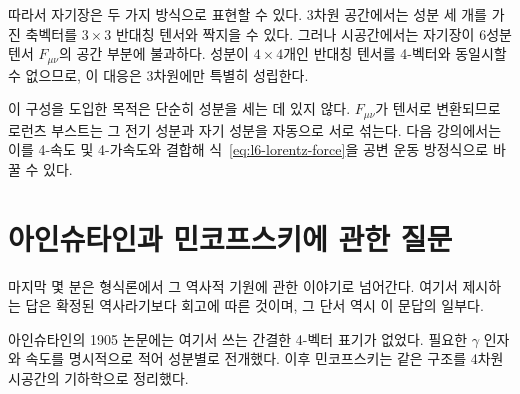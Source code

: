 따라서 자기장은 두 가지 방식으로 표현할 수 있다. 3차원 공간에서는 성분 세 개를 가진 축벡터를 \(3\times3\) 반대칭 텐서와 짝지을 수 있다. 그러나 시공간에서는 자기장이 6성분 텐서 \(F_{\mu\nu}\)의 공간 부분에 불과하다. 성분이 \(4\times4\)개인 반대칭 텐서를 4-벡터와 동일시할 수 없으므로, 이 대응은 3차원에만 특별히 성립한다.

이 구성을 도입한 목적은 단순히 성분을 세는 데 있지 않다. \(F_{\mu\nu}\)가 텐서로 변환되므로 로런츠 부스트는 그 전기 성분과 자기 성분을 자동으로 서로 섞는다. 다음 강의에서는 이를 4-속도 및 4-가속도와 결합해 식~\eqref{eq:l6-lorentz-force}을 공변 운동 방정식으로 바꿀 수 있다.

\section{아인슈타인과 민코프스키에 관한 질문}

마지막 몇 분은 형식론에서 그 역사적 기원에 관한 이야기로 넘어간다. 여기서 제시하는 답은 확정된 역사라기보다 회고에 따른 것이며, 그 단서 역시 이 문답의 일부다.

\begin{classroomqa}\end{classroomqa}

아인슈타인의 1905 논문에는 여기서 쓰는 간결한 4-벡터 표기가 없었다. 필요한 \(\gamma\) 인자와 속도를 명시적으로 적어 성분별로 전개했다. 이후 민코프스키는 같은 구조를 4차원 시공간의 기하학으로 정리했다.

\begin{classroomqa}\end{classroomqa}

